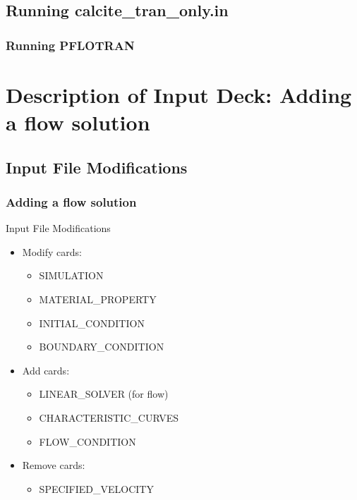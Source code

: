 \documentclass{beamer}
\begin{document}
\subsection{Running calcite_tran_only.in}

\begin{frame}[fragile]\frametitle{Running PFLOTRAN}


\end{frame}

\section{Description of Input Deck: Adding a flow solution}

\subsection{Input File Modifications}

\begin{frame}[fragile]\frametitle{Adding a flow solution}

Input File Modifications
\begin{itemize}
\item Modify cards:
  \begin{itemize}
    \item SIMULATION
    \item MATERIAL\_PROPERTY
    \item INITIAL\_CONDITION
    \item BOUNDARY\_CONDITION
   \end{itemize}
\item Add cards:
  \begin{itemize}
    \item LINEAR\_SOLVER (for flow)
    \item CHARACTERISTIC\_CURVES
    \item FLOW\_CONDITION
  \end{itemize}
\item Remove cards:
  \begin{itemize}
    \item SPECIFIED\_VELOCITY
  \end{itemize}
\end{itemize}

\end{frame}
\end{document}
